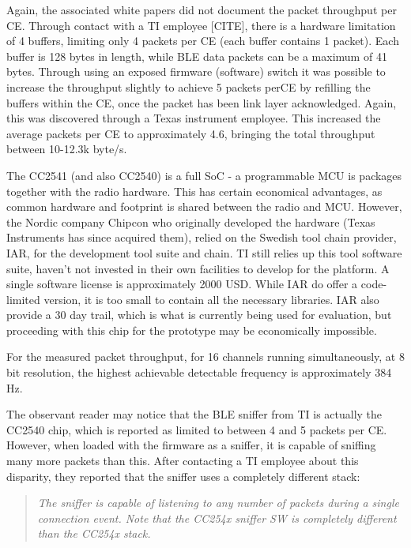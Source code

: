\documentclass[]{article}
\begin{document}
Again, the associated white papers did not document the packet throughput per \ac{CE}. Through contact with a \ac{TI} employee [CITE], there is a hardware limitation of 4 buffers, limiting only 4 packets per \ac{CE} (each buffer contains 1 packet). Each buffer is 128 bytes in length, while \ac{BLE} data packets can be a maximum of 41 bytes. Through using an exposed firmware (software) switch it was possible to increase the throughput slightly to achieve 5 packets per\ac{CE} by refilling the buffers within the \ac{CE}, once the packet has been link layer acknowledged. Again, this was discovered through a Texas instrument employee. This increased the average packets per \ac{CE} to approximately 4.6, bringing the total throughput between 10-12.3k byte/s.

The CC2541 (and also CC2540) is a full \ac{SoC} - a programmable \ac{MCU} is packages together with the radio hardware. This has certain economical advantages, as common hardware and footprint is shared between the radio and \ac{MCU}. However, the Nordic company Chipcon who originally developed the hardware (Texas Instruments has since acquired them), relied on the Swedish tool chain provider, IAR, for the development tool suite and chain. \ac{TI} still relies up this tool software suite, haven't not invested in their own facilities to develop for the platform. A single software license is approximately 2000 USD. While IAR do offer a code-limited version, it is too small to contain all the necessary libraries. IAR also provide a 30 day trail, which is what is currently being used for evaluation, but proceeding with this chip for the prototype may be economically impossible.

For the measured packet throughput, for 16 channels running simultaneously, at 8 bit resolution, the highest achievable detectable frequency is approximately 384 Hz.

The observant reader may notice that the \ac{BLE} sniffer from \ac{TI} is actually the CC2540 chip, which is reported as limited to between 4 and 5 packets per \ac{CE}. However, when loaded with the firmware as a sniffer, it is capable of sniffing many more packets than this. After contacting a \ac{TI} employee about this disparity, they reported that the sniffer uses a completely different stack:

\begin{quote}\itshape The sniffer is capable of listening to any number of packets during a single connection event. Note that the CC254x sniffer SW is completely different than the CC254x stack.\end{quote}
\end{document}

